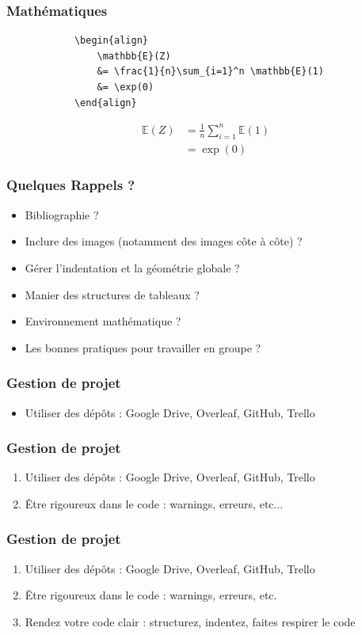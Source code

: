 \documentclass[handout]{beamer}
\begin{document}
	\begin{frame}[fragile=singleslide]
		\frametitle{Mathématiques}
		\centering
		\begin{verbatim}
			\begin{align}
				\mathbb{E}(Z)
				&= \frac{1}{n}\sum_{i=1}^n \mathbb{E}(1)
				&= \exp(0)
			\end{align}
		\end{verbatim}

		\begin{align}
			\mathbb{E}(Z)
			&= \frac{1}{n}\sum_{i=1}^n \mathbb{E}(1)\\
			&= \exp(0)
		\end{align}

	\end{frame}

	\begin{frame}
		\frametitle{Quelques Rappels ?}
		\begin{itemize}
			\item Bibliographie ?
			\item Inclure des images (notamment des images côte à côte) ?
			\item Gérer l'indentation et la géométrie globale ?
			\item Manier des structures de tableaux ?
			\item Environnement mathématique ?
			\item Les bonnes pratiques pour travailler en groupe ?
		\end{itemize}
	\end{frame}

	\begin{frame}
		\frametitle{Gestion de projet}
		\begin{itemize}
			\item Utiliser des dépôts : Google Drive, Overleaf, GitHub, Trello
		\end{itemize}
	\end{frame}

	\begin{frame}
		\frametitle{Gestion de projet}
		\begin{enumerate}
			\item Utiliser des dépôts : Google Drive, Overleaf, GitHub, Trello
			\item Être rigoureux dans le code : warnings, erreurs, etc...
		\end{enumerate}
	\end{frame}

	\begin{frame}
		\frametitle{Gestion de projet}
		\begin{enumerate}
			\item Utiliser des dépôts : Google Drive, Overleaf, GitHub, Trello
			\item Être rigoureux dans le code : warnings, erreurs, etc.
			\item Rendez votre code clair : structurez, indentez, faites respirer le code
		\end{enumerate}
	\end{frame}
\end{document}
